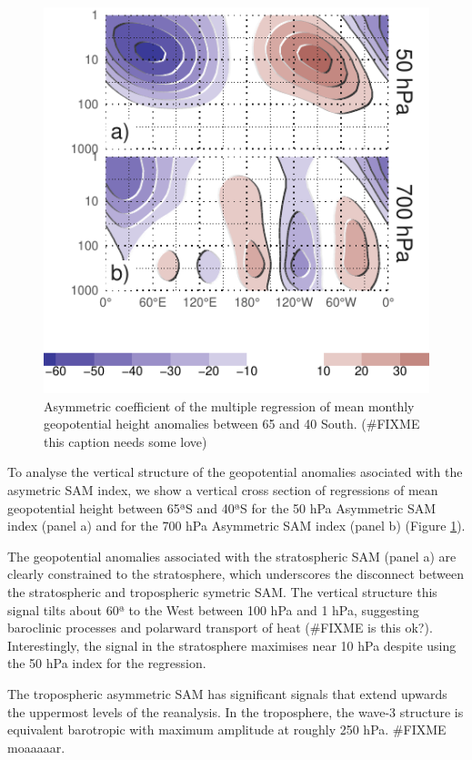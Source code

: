 \documentclass[]{ametsocV5}
\begin{document}
\begin{figure}
\includegraphics{vertical-regression-1} \caption[Asymmetric coefficient of the multiple regression of mean monthly geopotential height anomalies between 65 and 40 South]{Asymmetric coefficient of the multiple regression of mean monthly geopotential height anomalies between 65 and 40 South. (\#FIXME this caption needs some love)}\label{fig:vertical-regression}
\end{figure}

To analyse the vertical structure of the geopotential anomalies
asociated with the asymetric SAM index, we show a vertical cross section
of regressions of mean geopotential height between 65ªS and 40ªS for the
50 hPa Asymmetric SAM index (panel a) and for the 700 hPa Asymmetric SAM
index (panel b) (Figure \ref{fig:vertical-regression}).

The geopotential anomalies associated with the stratospheric SAM (panel
a) are clearly constrained to the stratosphere, which underscores the
disconnect between the stratospheric and tropospheric symetric SAM. The
vertical structure this signal tilts about 60ª to the West between 100
hPa and 1 hPa, suggesting baroclinic processes and polarward transport
of heat (\#FIXME is this ok?). Interestingly, the signal in the
stratosphere maximises near 10 hPa despite using the 50 hPa index for
the regression.

The tropospheric asymmetric SAM has significant signals that extend
upwards the uppermost levels of the reanalysis. In the troposphere, the
wave-3 structure is equivalent barotropic with maximum amplitude at
roughly 250 hPa. \#FIXME moaaaaar.
\end{document}
